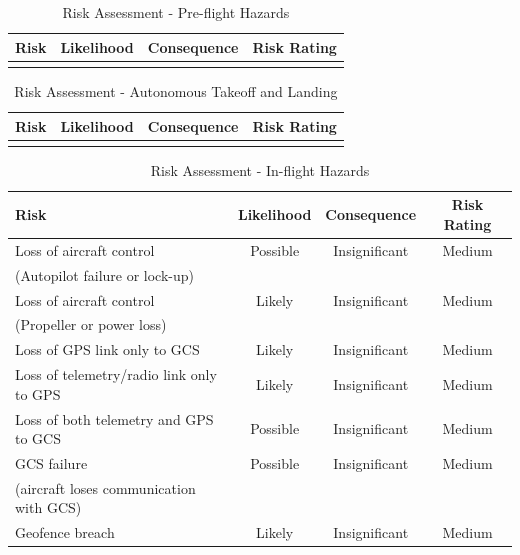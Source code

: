 \begin{table}[!h]
	\label{tab:risks-preflight}
	\centering
	\begin{tabularx}{\textwidth}{|Y|c|c|c|}
		\hline
		\textbf{Risk} & \textbf{Likelihood} & \textbf{Consequence} & \textbf{Risk Rating}\\
		\hline
		 & & & \\
		\hline
	\end{tabularx} 
	\caption{Risk Assessment - Pre-flight Hazards}
\end{table}

\begin{table}[!h]
	\label{tab:risks-autonomy}
	\centering
	\begin{tabularx}{\textwidth}{|Y|c|c|c|}
		\hline
		\textbf{Risk} & \textbf{Likelihood} & \textbf{Consequence} & \textbf{Risk Rating}\\
		\hline
		& & & \\
		\hline
	\end{tabularx} 
	\caption{Risk Assessment - Autonomous Takeoff and Landing}
\end{table}

\begin{table}[!h]
	\label{tab:risks-inflight}
	\centering
	\begin{tabularx}{\textwidth}{|Y|c|c|c|}
		\hline
		\textbf{Risk} & \textbf{Likelihood} & \textbf{Consequence} & \textbf{Risk Rating}\\
		\hline
		Loss of aircraft control & Possible & Insignificant & Medium \\
		(Autopilot failure or lock-up) & & & \\
		\hline
		Loss of aircraft control  & Likely & Insignificant & Medium \\
		(Propeller or power loss) & & & \\
		\hline
		Loss of GPS link only to GCS & Likely & Insignificant & Medium \\
		\hline
		Loss of telemetry/radio link only to GPS & Likely & Insignificant & Medium \\
		\hline
		Loss of both telemetry and GPS to GCS & Possible & Insignificant & Medium \\
		\hline
		GCS failure & Possible & Insignificant & Medium \\
		(aircraft loses communication with GCS) & & & \\
		\hline
		Geofence breach & Likely & Insignificant & Medium \\
		\hline
	\end{tabularx} 
	\caption{Risk Assessment - In-flight Hazards}
\end{table}

